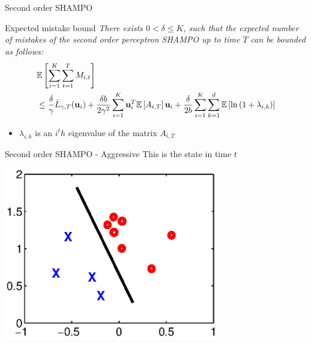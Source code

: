 \documentclass{beamer}
\begin{document}
\begin{frame}{Second order SHAMPO}
\begin{block}{Expected mistake bound}
\emph{There exists $0<\delta\le K$, such that the  expected number of mistakes  of the second order perceptron SHAMPO  up to time $T$ can be bounded as follows:}
  \begin{equation*}
  \begin{split}
   &\mathbb{E}\left[{\sum_{i=1}^{K}\sum_{t=1}^{T}{M_{i,t}}}\right] \\
   &\le \frac{\delta}{\gamma}{\bar L}_{\gamma,T}(\mathbf{u}_{i})
+ \frac{\delta b}{2\gamma^2}\sum_{i=1}^{K}\mathbf{u}_i^T\mathbb{E}\left[{A_{i,T}}\right]\mathbf{u}_i+ 
\frac{\delta}{2b}\sum_{i=1}^{K}\sum_{k=1}^{d}\mathbb{E}\left[{\ln\left({1+\lambda_{i,k}}\right)}\right]
\end{split}
\end{equation*} 
\end{block}

\begin{itemize}
  \item  $\lambda_{i,k}$ is an $i^th$ eigenvalue of the matrix $A_{i,T}$
\end{itemize}

\end{frame}

\begin{frame}{Second order SHAMPO - Aggressive}
This is the state in time $t$
\begin{center}
\includegraphics[width=0.7\textwidth]{figs/confidence.eps}
\end{center}
\end{frame}
\end{document}
